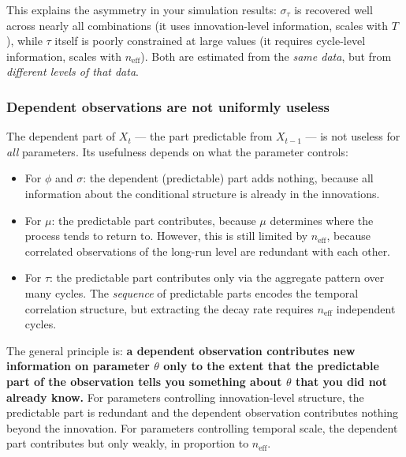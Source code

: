 \documentclass[11pt, a4paper]{article}
\begin{document}
This explains the asymmetry in your simulation results: $\sigma_\tau$ is recovered
well across nearly all combinations (it uses innovation-level information, scales
with $T$), while $\tau$ itself is poorly constrained at large values (it requires
cycle-level information, scales with $n_\mathrm{eff}$).
Both are estimated from the \emph{same data}, but from \emph{different levels of
that data}.

\subsubsection*{Dependent observations are not uniformly useless}

The dependent part of $X_t$ --- the part predictable from $X_{t-1}$ --- is not
useless for \emph{all} parameters.
Its usefulness depends on what the parameter controls:

\begin{itemize}[noitemsep]
    \item For $\phi$ and $\sigma$: the dependent (predictable) part adds nothing,
          because all information about the conditional structure is already in the
          innovations.
    \item For $\mu$: the predictable part contributes, because $\mu$ determines
          where the process tends to return to.
          However, this is still limited by $n_\mathrm{eff}$, because correlated
          observations of the long-run level are redundant with each other.
    \item For $\tau$: the predictable part contributes only via the aggregate
          pattern over many cycles.
          The \emph{sequence} of predictable parts encodes the temporal correlation
          structure, but extracting the decay rate requires $n_\mathrm{eff}$ independent
          cycles.
\end{itemize}

The general principle is: \textbf{a dependent observation contributes new information
on parameter $\theta$ only to the extent that the predictable part of the observation
tells you something about $\theta$ that you did not already know.}
For parameters controlling innovation-level structure, the predictable part is
redundant and the dependent observation contributes nothing beyond the innovation.
For parameters controlling temporal scale, the dependent part contributes but only
weakly, in proportion to $n_\mathrm{eff}$.
\end{document}
